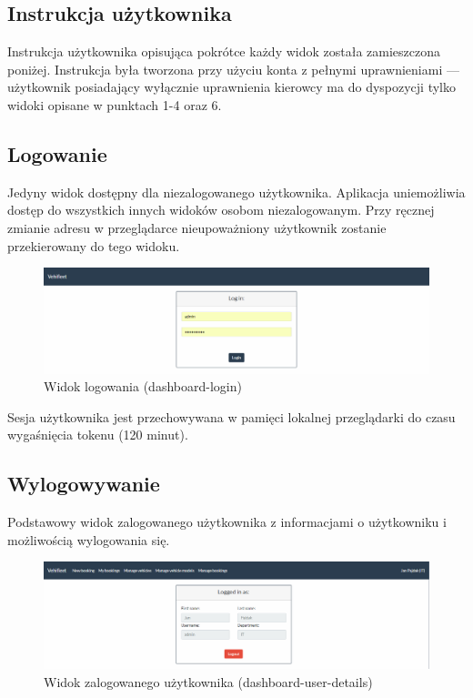 \documentclass[eng,printmode,openany]{mgr}
\begin{document}
	
	
	\newpage	
	\begin{appendices}		
		\chapter{Instrukcja użytkownika}
		Instrukcja użytkownika opisująca pokrótce każdy widok została zamieszczona poniżej. Instrukcja była tworzona przy użyciu konta z pełnymi uprawnieniami — użytkownik posiadający wyłącznie uprawnienia kierowcy ma do dyspozycji tylko widoki opisane w punktach 1-4 oraz 6.
		
		\section{Logowanie}
		Jedyny widok dostępny dla niezalogowanego użytkownika. Aplikacja uniemożliwia dostęp do wszystkich innych widoków osobom niezalogowanym. Przy ręcznej zmianie adresu w przeglądarce nieupoważniony użytkownik zostanie przekierowany do tego widoku.
		\begin{figure}[H]
			\centering
			\includegraphics[width=\textwidth]{images/views/dashboard-login.png}
			\caption{Widok logowania (dashboard-login)}
		\end{figure}
		Sesja użytkownika jest przechowywana w pamięci lokalnej przeglądarki do czasu wygaśnięcia tokenu (120 minut).
		
		\newpage
		\section{Wylogowywanie}
		Podstawowy widok zalogowanego użytkownika z informacjami o użytkowniku i możliwością wylogowania się.
		\begin{figure}[H]
			\centering
			\includegraphics[width=\textwidth]{images/views/dashboard-logout.png}
			\caption{Widok zalogowanego użytkownika (dashboard-user-details)}
		\end{figure}
		

\end{appendices}
\end{document}
